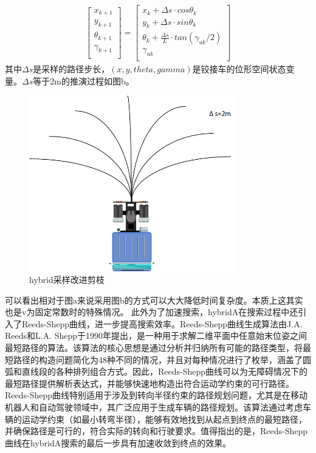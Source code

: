 \documentclass[master,academic]{ysuthesis} %
\begin{document}
		\begin{equation}
			\begin{aligned}
				\left[ \begin{array}{c}
					x_{k+1}\\
					y_{k+1}\\
					\theta _{k+1}\\
					\gamma _{k+1}\\
				\end{array} \right] =\left[ \begin{array}{c}
					x_k+\Delta s\cdot cos\theta _k\\
					y_k+\Delta s\cdot sin\theta _k\\
					\theta _k+\frac{\Delta s}{L}\cdot tan (\gamma _{uk}/2 )\\
					\gamma _{uk}\\
				\end{array} \right] 
			\end{aligned}
		\end{equation}
		其中$\Delta s$是采样的路径步长，$(x,y,theta,gamma)$是铰接车的位形空间状态变量。$\Delta s$等于2m的推演过程如图b。
		\begin{figure}[!ht]
			\centering
			\includegraphics[width=0.8\textwidth]{hybrid采样改进剪枝.png}
			\caption{hybrid采样改进剪枝}
			\label{fig:hybrid采样改进剪枝}
		\end{figure}
		可以看出相对于图a来说采用图b的方式可以大大降低时间复杂度。本质上这其实也是v为固定常数时的特殊情况。
		此外为了加速搜索，hybridA在搜索过程中还引入了Reeds-Shepp曲线，进一步提高搜索效率。Reeds-Shepp曲线生成算法由J.A. Reeds和L.A. Shepp于1990年提出，是一种用于求解二维平面中任意始末位姿之间最短路径的算法。该算法的核心思想是通过分析并归纳所有可能的路径类型，将最短路径的构造问题简化为48种不同的情况，并且对每种情况进行了枚举，涵盖了圆弧和直线段的各种排列组合方式。因此，Reeds-Shepp曲线可以为无障碍情况下的最短路径提供解析表达式，并能够快速地构造出符合运动学约束的可行路径。Reeds-Shepp曲线特别适用于涉及到转向半径约束的路径规划问题，尤其是在移动机器人和自动驾驶领域中，其广泛应用于生成车辆的路径规划。该算法通过考虑车辆的运动学约束（如最小转弯半径），能够有效地找到从起点到终点的最短路径，并确保路径是可行的，符合实际的转向和行驶要求。值得指出的是，Reeds-Shepp曲线在hybridA搜索的最后一步具有加速收敛到终点的效果。
\end{document}
